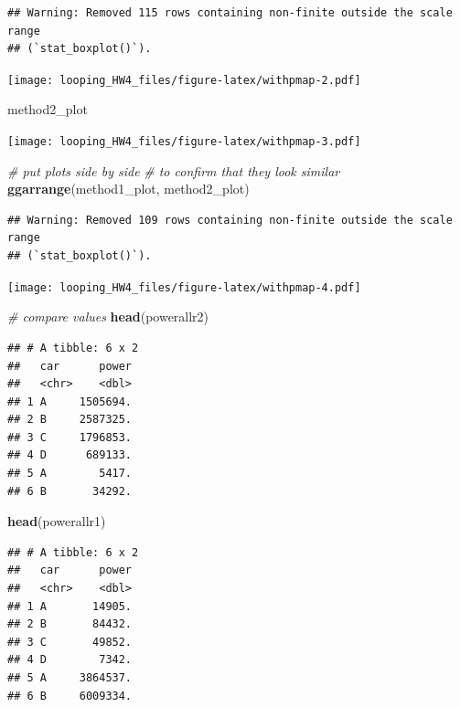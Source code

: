 \documentclass[
]{article}
\newenvironment{Shaded}{\begin{snugshade}}{\end{snugshade}}
\newcommand{\CommentTok}[1]{\textcolor[rgb]{0.56,0.35,0.01}{\textit{#1}}}
\newcommand{\FunctionTok}[1]{\textcolor[rgb]{0.13,0.29,0.53}{\textbf{#1}}}
\newcommand{\NormalTok}[1]{#1}
\begin{document}
\begin{verbatim}
## Warning: Removed 115 rows containing non-finite outside the scale range
## (`stat_boxplot()`).
\end{verbatim}

\texttt{[image: looping\_HW4\_files/figure-latex/withpmap-2.pdf]}

\begin{Shaded}
\begin{Highlighting}[]
\NormalTok{method2\_plot}
\end{Highlighting}
\end{Shaded}

\texttt{[image: looping\_HW4\_files/figure-latex/withpmap-3.pdf]}

\begin{Shaded}
\begin{Highlighting}[]
\CommentTok{\# put plots side by side}
\CommentTok{\# to confirm that they look similar}
\FunctionTok{ggarrange}\NormalTok{(method1\_plot, method2\_plot)}
\end{Highlighting}
\end{Shaded}

\begin{verbatim}
## Warning: Removed 109 rows containing non-finite outside the scale range
## (`stat_boxplot()`).
\end{verbatim}

\texttt{[image: looping\_HW4\_files/figure-latex/withpmap-4.pdf]}

\begin{Shaded}
\begin{Highlighting}[]
\CommentTok{\# compare values}
\FunctionTok{head}\NormalTok{(powerallr2)}
\end{Highlighting}
\end{Shaded}

\begin{verbatim}
## # A tibble: 6 x 2
##   car      power
##   <chr>    <dbl>
## 1 A     1505694.
## 2 B     2587325.
## 3 C     1796853.
## 4 D      689133.
## 5 A        5417.
## 6 B       34292.
\end{verbatim}

\begin{Shaded}
\begin{Highlighting}[]
\FunctionTok{head}\NormalTok{(powerallr1)}
\end{Highlighting}
\end{Shaded}

\begin{verbatim}
## # A tibble: 6 x 2
##   car      power
##   <chr>    <dbl>
## 1 A       14905.
## 2 B       84432.
## 3 C       49852.
## 4 D        7342.
## 5 A     3864537.
## 6 B     6009334.
\end{verbatim}
\end{document}
